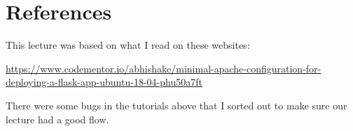 \documentclass[10pt]{article}
\begin{document}
\section{References}
This lecture was based on what I read  on these websites:

\url{https://www.codementor.io/abhishake/minimal-apache-configuration-for-deploying-a-flask-app-ubuntu-18-04-phu50a7ft}



There were some bugs in the tutorials above that I sorted out to make sure our lecture had a good flow.
\end{document}

